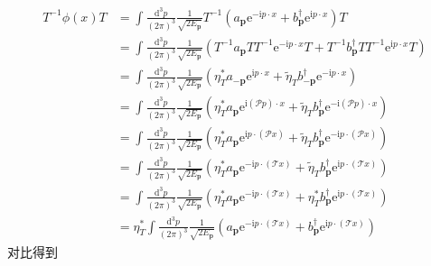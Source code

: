 \begin{equation}
    \begin{aligned}
        T^{-1}\phi \left( x \right) T&=\int{\frac{\mathrm{d}^3p}{\left( 2\pi \right) ^3}\frac{1}{\sqrt{2E_{\mathbf{p}}}}T^{-1}\left( a_{\mathbf{p}}\mathrm{e}^{-\mathrm{i}p\cdot x}+b_{\mathbf{p}}^{\dagger}\mathrm{e}^{\mathrm{i}p\cdot x} \right)}T
\\
&=\int{\frac{\mathrm{d}^3p}{\left( 2\pi \right) ^3}}\frac{1}{\sqrt{2E_{\mathbf{p}}}}\left( T^{-1}a_{\mathbf{p}}TT^{-1}\mathrm{e}^{-\mathrm{i}p\cdot x}T+T^{-1}b_{\mathbf{p}}^{\dagger}TT^{-1}\mathrm{e}^{\mathrm{i}p\cdot x}T \right) 
\\
&=\int{\frac{\mathrm{d}^3p}{\left( 2\pi \right) ^3}}\frac{1}{\sqrt{2E_{\mathbf{p}}}}\left( \eta _{T}^{*}a_{-\mathbf{p}}\mathrm{e}^{\mathrm{i}p\cdot x}+\tilde{\eta}_Tb_{-\mathbf{p}}^{\dagger}\mathrm{e}^{-\mathrm{i}p\cdot x} \right) 
\\
&=\int{\frac{\mathrm{d}^3p}{\left( 2\pi \right) ^3}}\frac{1}{\sqrt{2E_{\mathbf{p}}}}\left( \eta _{T}^{*}a_{\mathbf{p}}\mathrm{e}^{\mathrm{i}\left( \mathcal{P} p \right) \cdot x}+\tilde{\eta}_Tb_{\mathbf{p}}^{\dagger}\mathrm{e}^{-\mathrm{i}\left( \mathcal{P} p \right) \cdot x} \right) 
\\
&=\int{\frac{\mathrm{d}^3p}{\left( 2\pi \right) ^3}}\frac{1}{\sqrt{2E_{\mathbf{p}}}}\left( \eta _{T}^{*}a_{\mathbf{p}}\mathrm{e}^{\mathrm{i}p\cdot \left( \mathcal{P} x \right)}+\tilde{\eta}_Tb_{\mathbf{p}}^{\dagger}\mathrm{e}^{-\mathrm{i}p\cdot \left( \mathcal{P} x \right)} \right) 
\\
&=\int{\frac{\mathrm{d}^3p}{\left( 2\pi \right) ^3}}\frac{1}{\sqrt{2E_{\mathbf{p}}}}\left( \eta _{T}^{*}a_{\mathbf{p}}\mathrm{e}^{-\mathrm{i}p\cdot (\mathcal{T} x)}+\tilde{\eta}_Tb_{\mathbf{p}}^{\dagger}\mathrm{e}^{\mathrm{i}p\cdot (\mathcal{T} x)} \right) 
\\
&=\int{\frac{\mathrm{d}^3p}{\left( 2\pi \right) ^3}}\frac{1}{\sqrt{2E_{\mathbf{p}}}}\left( \eta _{T}^{*}a_{\mathbf{p}}\mathrm{e}^{-\mathrm{i}p\cdot (\mathcal{T} x)}+\eta _{T}^{*}b_{\mathbf{p}}^{\dagger}\mathrm{e}^{\mathrm{i}p\cdot (\mathcal{T} x)} \right) 
\\
&=\eta _{T}^{*}\int{\frac{\mathrm{d}^3p}{\left( 2\pi \right) ^3}}\frac{1}{\sqrt{2E_{\mathbf{p}}}}\left( a_{\mathbf{p}}\mathrm{e}^{-\mathrm{i}p\cdot (\mathcal{T} x)}+b_{\mathbf{p}}^{\dagger}\mathrm{e}^{\mathrm{i}p\cdot (\mathcal{T} x)} \right) 
    \end{aligned}
\end{equation}
对比得到

